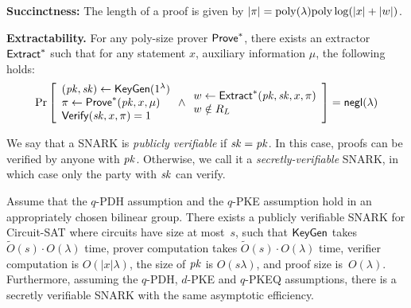 \begin{definition}[SNARK]
\begin{description}
\item
\textbf{Succinctness:}
The length of a proof is given by
$|\pi| = \poly(\lambda) \poly \log (|x|+|w|)$.
\item
\textbf{Extractability.}
For any poly-size
prover $\P^*$, there exists an extractor $\Ex^*$
such that for any statement $x$, 
auxiliary information 
$\mu$, the following holds:
\[
\Pr\left[
\begin{array}{l}
(\pk, \sk) \leftarrow \algKeygen(1^\lambda)\\
\pi \leftarrow \P^*(\pk, x, \mu)\\
\V(\sk, x, \pi) = 1
\end{array}
\wedge
\begin{array}{l}
w \leftarrow \Ex^*(\pk, \sk, x, \pi) \\
w \notin R_L
\end{array}
\right] = {\sf negl}(\lambda)
\]
\end{description}
\end{definition}

We say that a SNARK is {\it publicly
verifiable} if $\sk = \pk$.
In this case, proofs can be verified by anyone with $\pk$.
Otherwise, we call it a {\it secretly-verifiable} SNARK, in which
case only the party with $\sk$ can verify.

\begin{lemma}
Assume that the $q$-PDH assumption
and the $q$-PKE assumption
hold in an appropriately chosen bilinear group.
There exists a publicly verifiable SNARK
for Circuit-SAT where circuits have size at most~$s$,
such that
$\algKeygen$ takes $\tilde{O}(s) \cdot O(\lambda)$ time,
prover computation takes $\tilde{O}(s) \cdot O(\lambda)$ time,
verifier computation is
$O(|x| \lambda)$, the size of $\pk$ is
$O(s\lambda)$,
and proof size is~$O(\lambda)$.
Furthermore, assuming the $q$-PDH, $d$-PKE and
$q$-PKEQ assumptions,
there is a secretly verifiable SNARK
with the same asymptotic efficiency.
\end{lemma}


